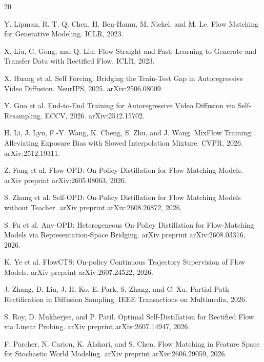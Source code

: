 \documentclass[11pt]{article}
\begin{document}
\begin{thebibliography}{20}

Y. Lipman, R. T. Q. Chen, H. Ben-Hamu, M. Nickel, and M. Le.
\newblock Flow Matching for Generative Modeling.
\newblock ICLR, 2023.

X. Liu, C. Gong, and Q. Liu.
\newblock Flow Straight and Fast: Learning to Generate and Transfer Data with Rectified Flow.
\newblock ICLR, 2023.

X. Huang et al.
\newblock Self Forcing: Bridging the Train-Test Gap in Autoregressive Video Diffusion.
\newblock NeurIPS, 2025.
\newblock arXiv:2506.08009.

Y. Guo et al.
\newblock End-to-End Training for Autoregressive Video Diffusion via Self-Resampling.
\newblock ECCV, 2026.
\newblock arXiv:2512.15702.

H. Li, J. Lyu, F.-Y. Wang, K. Cheng, S. Zhu, and J. Wang.
\newblock MixFlow Training: Alleviating Exposure Bias with Slowed Interpolation Mixture.
\newblock CVPR, 2026.
\newblock arXiv:2512.19311.

Z. Fang et al.
\newblock Flow-OPD: On-Policy Distillation for Flow Matching Models.
\newblock arXiv preprint arXiv:2605.08063, 2026.

S. Zhang et al.
\newblock Self-OPD: On-Policy Distillation for Flow Matching Models without Teacher.
\newblock arXiv preprint arXiv:2608.26872, 2026.

S. Fu et al.
\newblock Any-OPD: Heterogeneous On-Policy Distillation for Flow-Matching Models via Representation-Space Bridging.
\newblock arXiv preprint arXiv:2608.03316, 2026.

K. Ye et al.
\newblock FlowCTS: On-policy Continuous Trajectory Supervision of Flow Models.
\newblock arXiv preprint arXiv:2607.24522, 2026.

J. Zhang, D. Liu, J. H. Ko, E. Park, S. Zhang, and C. Xu.
\newblock Partial-Path Rectification in Diffusion Sampling.
\newblock IEEE Transactions on Multimedia, 2026.

S. Roy, D. Mukherjee, and P. Patil.
\newblock Optimal Self-Distillation for Rectified Flow via Linear Probing.
\newblock arXiv preprint arXiv:2607.14947, 2026.

F. Porcher, N. Carion, K. Alahari, and S. Chen.
\newblock Flow Matching in Feature Space for Stochastic World Modeling.
\newblock arXiv preprint arXiv:2606.29059, 2026.

\end{thebibliography}
\end{document}
